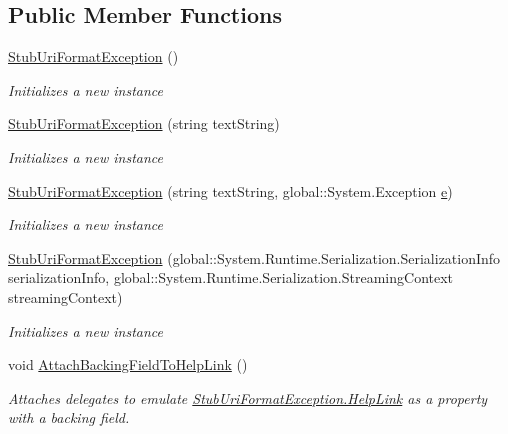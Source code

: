 \subsection*{Public Member Functions}
\begin{DoxyCompactItemize}
\item 
\hyperlink{class_system_1_1_fakes_1_1_stub_uri_format_exception_ad0c9043f3732ab51afaef1b445e938c8}{Stub\-Uri\-Format\-Exception} ()
\begin{DoxyCompactList}\small\item\em Initializes a new instance\end{DoxyCompactList}\item 
\hyperlink{class_system_1_1_fakes_1_1_stub_uri_format_exception_aafc8bc206a75b846a9bf3ad8f0886f57}{Stub\-Uri\-Format\-Exception} (string text\-String)
\begin{DoxyCompactList}\small\item\em Initializes a new instance\end{DoxyCompactList}\item 
\hyperlink{class_system_1_1_fakes_1_1_stub_uri_format_exception_aa61747ce2e106a05c37932724c77425e}{Stub\-Uri\-Format\-Exception} (string text\-String, global\-::\-System.\-Exception \hyperlink{jquery-1_810_82_8min_8js_a2c038346d47955cbe2cb91e338edd7e1}{e})
\begin{DoxyCompactList}\small\item\em Initializes a new instance\end{DoxyCompactList}\item 
\hyperlink{class_system_1_1_fakes_1_1_stub_uri_format_exception_a414b0d83d1e74b5acc48e06112d37572}{Stub\-Uri\-Format\-Exception} (global\-::\-System.\-Runtime.\-Serialization.\-Serialization\-Info serialization\-Info, global\-::\-System.\-Runtime.\-Serialization.\-Streaming\-Context streaming\-Context)
\begin{DoxyCompactList}\small\item\em Initializes a new instance\end{DoxyCompactList}\item 
void \hyperlink{class_system_1_1_fakes_1_1_stub_uri_format_exception_a440a754362754e1e8b8f2a3eb98fab6b}{Attach\-Backing\-Field\-To\-Help\-Link} ()
\begin{DoxyCompactList}\small\item\em Attaches delegates to emulate \hyperlink{class_system_1_1_fakes_1_1_stub_uri_format_exception_ae7dc5ce05c98088406f79cb9a04e86e8}{Stub\-Uri\-Format\-Exception.\-Help\-Link} as a property with a backing field.\end{DoxyCompactList}\item 

\end{DoxyCompactItemize}
